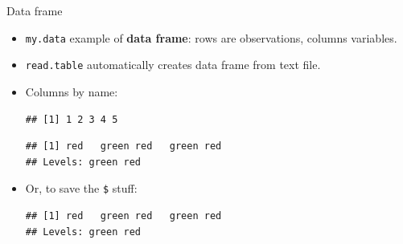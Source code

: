 \begin{frame}[fragile]{Data frame}
  
  \begin{itemize}
  \item \texttt{my.data} example of \textbf{data frame}: rows are
    observations, columns variables.
  \item \texttt{read.table} automatically creates data frame from text file.
  \item Columns by name:
 
\begin{knitrout}
\color{fgcolor}\begin{kframe}
\begin{alltt}
\hlopt{$}
\end{alltt}
\begin{verbatim}
## [1] 1 2 3 4 5
\end{verbatim}
\begin{alltt}
\hlopt{$}
\end{alltt}
\begin{verbatim}
## [1] red   green red   green red  
## Levels: green red
\end{verbatim}
\end{kframe}
\end{knitrout}

\item Or, to save the \texttt{\$} stuff:
  
 
\begin{knitrout}
\color{fgcolor}\begin{kframe}
\begin{alltt}
\end{alltt}
\begin{verbatim}
## [1] red   green red   green red  
## Levels: green red
\end{verbatim}
\end{kframe}
\end{knitrout}
  

  \end{itemize}
  
\end{frame}

